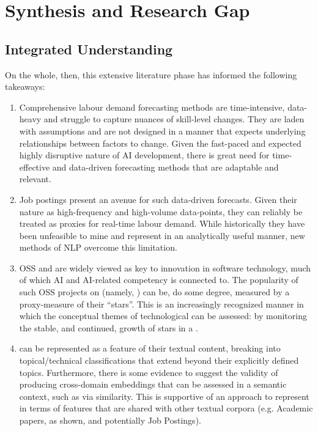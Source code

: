 \section{Synthesis and Research Gap}
\subsection{Integrated Understanding}

On the whole, then, this extensive literature phase has informed the following takeaways:

\begin{enumerate}
  \item Comprehensive labour demand forecasting methods are time-intensive, data-heavy and struggle to capture nuances of skill-level changes. They are laden with assumptions and are not designed in a manner that expects underlying relationships between factors to change. Given the fast-paced and expected highly disruptive nature of AI development, there is great need for time-effective and data-driven forecasting methods that are adaptable and relevant.
  \item Job postings present an avenue for such data-driven forecasts. Given their nature as high-frequency and high-volume data-points, they can reliably be treated as proxies for real-time labour demand. While historically they have been unfeasible to mine and represent in an analytically useful manner, new methods of NLP overcome this limitation.
  \item OSS and \ghrepo{} are widely viewed as key to innovation in software technology, much of which AI and AI-related competency is connected to. The popularity of such OSS projects on \gh{} (namely, \repos{}) can be, do some degree, measured by a proxy-measure of their ``stars''. This is an increasingly recognized manner in which the conceptual themes of technological can be assessed: by monitoring the stable, and continued, growth of stars in a \repo{}.
  \item \ghrepo{} can be represented as a feature of their textual content, breaking into topical/technical classifications that extend beyond their explicitly defined topics. Furthermore, there is some evidence to suggest the validity of producing cross-domain embeddings that can be assessed in a semantic context, such as via similarity. This is supportive of an approach to represent \ghrepo{} in terms of features that are shared with other textual corpora (e.g. Academic papers, as shown, and potentially Job Postings).
\end{enumerate}

